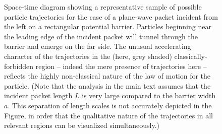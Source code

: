 \documentclass[aps,prc,onecolumn,letterpaper,floatfix,12pt]{revtex4}
\begin{document}
\begin{figure}[t]
\begin{center}
\caption{
Space-time diagram showing a 
representative sample of possible particle trajectories for the case
of a plane-wave packet incident from the left on a rectangular
potential barrier.  Particles beginning near the leading edge of the
incident packet will tunnel through the barrier and emerge on the far
side.  The unusual accelerating character of the trajectories in the
(here, grey shaded) classically-forbidden region -- indeed the mere
presence of trajectories here -- reflects the highly non-classical
nature of the law of motion for the particle.  (Note that the analysis
in the main text assumes that the incident packet length $L$ is very
large compared to the barrier width $a$.  This separation of length
scales is not accurately depicted in the Figure, in order that the
qualitative nature of the trajectories in all relevant regions can be
visualized simultaneously.)
\label{fig4}
}
\end{center}
\end{figure}
\end{document}

